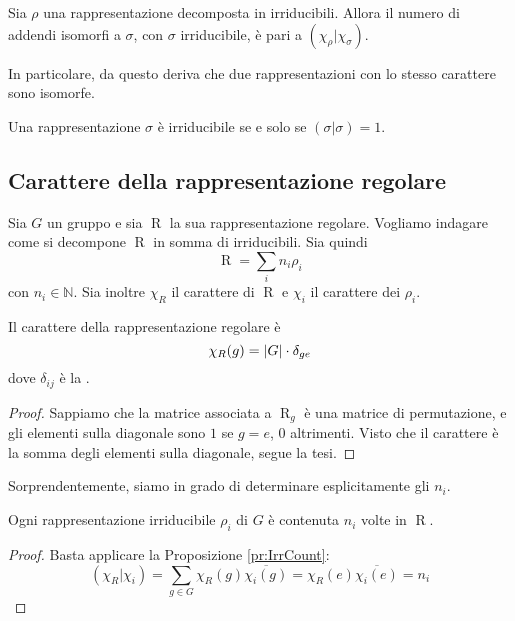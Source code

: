 \documentclass[a4paper,10pt,oneside]{math_article}
\newcommand{\herm}[2]{\left(#1 | #2\right)}
\DeclareMathOperator{\Reg}{R}
\let\conj\overline
\begin{document}
    \begin{myprop}\label{pr:IrrCount}
     Sia $\rho$ una rappresentazione decomposta in irriducibili. Allora il numero di addendi isomorfi a $\sigma$, con $\sigma$ irriducibile, è pari a $\herm{\chi_\rho}{\chi_\sigma}$.
    \end{myprop}

    In particolare, da questo deriva che due rappresentazioni con lo stesso carattere sono isomorfe.
    
    \begin{mytheorem}
     Una rappresentazione $\sigma$ è irriducibile se e solo se $\herm\sigma\sigma=1$.
    \end{mytheorem}

   \subsection{Carattere della rappresentazione regolare}
    Sia $G$ un gruppo e sia $\Reg$ la sua rappresentazione regolare. Vogliamo indagare come si decompone $\Reg$ in somma di irriducibili. Sia quindi
    \[
     \Reg = \sum_i n_i \rho_i
    \]
    con $n_i \in \mathbb N$. Sia inoltre $\chi_R$ il carattere di $\Reg$ e $\chi_i$ il carattere dei $\rho_i$.
      
    \begin{myprop}
     Il carattere della rappresentazione regolare è
      \[
      \chi_R(g) = \left|G\right| \cdot \delta_{ge}
      \]
     dove $\delta_{ij}$ è la .
    \end{myprop}
    
    \begin{proof}
      Sappiamo che la matrice associata a $\Reg_g$ è una matrice di permutazione, e gli elementi sulla diagonale sono $1$ se $g=e$, $0$ altrimenti. Visto che il carattere è la somma degli elementi sulla diagonale, segue la tesi.
    \end{proof}
    
    Sorprendentemente, siamo in grado di determinare esplicitamente gli $n_i$.
    \begin{myprop}
     Ogni rappresentazione irriducibile $\rho_i$ di $G$ è contenuta $n_i$ volte in $\Reg$.
    \end{myprop}
    
    \begin{proof}
     Basta applicare la Proposizione \ref{pr:IrrCount}:
     \[
      \herm{\chi_R}{\chi_i} = \sum_{g\in G} \chi_R(g)\conj{\chi_i(g)} = \chi_R(e)\conj{\chi_i(e)} = n_i
     \]

    \end{proof}
\end{document}
